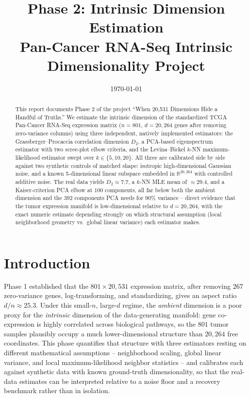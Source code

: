 \documentclass[11pt]{article}
\title{Phase 2: Intrinsic Dimension Estimation \\
\large Pan-Cancer RNA-Seq Intrinsic Dimensionality Project}
\author{}
\date{\today}
\begin{document}
\maketitle

\begin{abstract}
This report documents Phase 2 of the project ``When 20,531 Dimensions Hide a
Handful of Truths.'' We estimate the intrinsic dimension of the
standardized TCGA Pan-Cancer RNA-Seq expression matrix ($n=801$,
$d=20{,}264$ genes after removing zero-variance columns) using three
independent, natively implemented estimators: the Grassberger--Procaccia
correlation dimension $D_2$, a PCA-based eigenspectrum estimator with two
scree-plot elbow criteria, and the Levina--Bickel $k$-NN maximum-likelihood
estimator swept over $k \in \{5, 10, 20\}$. All three are calibrated
side by side against two synthetic controls of matched shape: isotropic
high-dimensional Gaussian noise, and a known 5-dimensional linear subspace
embedded in $\mathbb{R}^{20{,}264}$ with controlled additive noise. The
real data yields $D_2 \approx 7.7$, a $k$-NN MLE mean of $\approx 29.4$,
and a Kaiser-criterion PCA elbow at $100$ components, all far below both
the ambient dimension and the $392$ components PCA needs for $90\%$
variance -- direct evidence that the tumor expression manifold is
low-dimensional relative to $d=20{,}264$, with the exact numeric estimate
depending strongly on which structural assumption (local neighborhood
geometry vs.\ global linear variance) each estimator makes.
\end{abstract}

\section{Introduction}

Phase 1 established that the $801 \times 20{,}531$ expression matrix, after
removing $267$ zero-variance genes, log-transforming, and standardizing,
gives an aspect ratio $d/n \approx 25.3$. Under this small-$n$,
large-$d$ regime, the \emph{ambient} dimension is a poor proxy for the
\emph{intrinsic} dimension of the data-generating manifold: gene
co-expression is highly correlated across biological pathways, so the
$801$ tumor samples plausibly occupy a much lower-dimensional structure
than $20{,}264$ free coordinates. This phase quantifies that structure with
three estimators resting on different mathematical assumptions --
neighborhood scaling, global linear variance, and local maximum-likelihood
neighbor statistics -- and calibrates each against synthetic data with
known ground-truth dimensionality, so that the real-data estimates can be
interpreted relative to a noise floor and a recovery benchmark rather than
in isolation.
\end{document}
